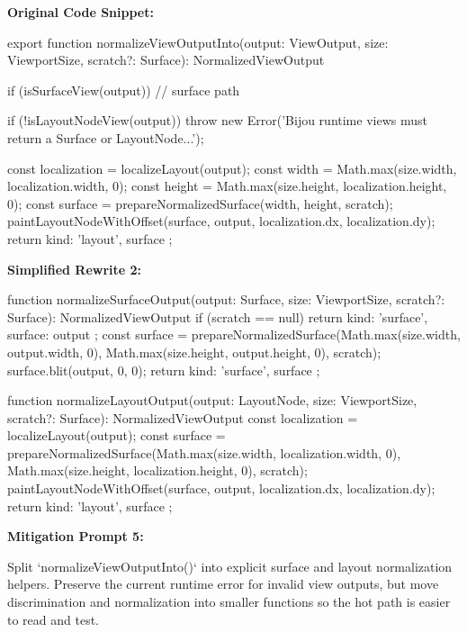 \textbf{Original Code Snippet:}

\begin{CodeBlock}
export function normalizeViewOutputInto(output: ViewOutput, size: ViewportSize, scratch?: Surface): NormalizedViewOutput {
  if (isSurfaceView(output)) {
    // surface path
  }

  if (!isLayoutNodeView(output)) {
    throw new Error('Bijou runtime views must return a Surface or LayoutNode...');
  }

  const localization = localizeLayout(output);
  const width = Math.max(size.width, localization.width, 0);
  const height = Math.max(size.height, localization.height, 0);
  const surface = prepareNormalizedSurface(width, height, scratch);
  paintLayoutNodeWithOffset(surface, output, localization.dx, localization.dy);
  return { kind: 'layout', surface };
}
\end{CodeBlock}

\textbf{Simplified Rewrite 2:}

\begin{CodeBlock}
function normalizeSurfaceOutput(output: Surface, size: ViewportSize, scratch?: Surface): NormalizedViewOutput {
  if (scratch == null) return { kind: 'surface', surface: output };
  const surface = prepareNormalizedSurface(Math.max(size.width, output.width, 0), Math.max(size.height, output.height, 0), scratch);
  surface.blit(output, 0, 0);
  return { kind: 'surface', surface };
}

function normalizeLayoutOutput(output: LayoutNode, size: ViewportSize, scratch?: Surface): NormalizedViewOutput {
  const localization = localizeLayout(output);
  const surface = prepareNormalizedSurface(Math.max(size.width, localization.width, 0), Math.max(size.height, localization.height, 0), scratch);
  paintLayoutNodeWithOffset(surface, output, localization.dx, localization.dy);
  return { kind: 'layout', surface };
}
\end{CodeBlock}

\textbf{Mitigation Prompt 5:}

\begin{CodeBlock}
Split `normalizeViewOutputInto()` into explicit surface and layout normalization helpers. Preserve the current runtime error for invalid view outputs, but move discrimination and normalization into smaller functions so the hot path is easier to read and test.
\end{CodeBlock}

